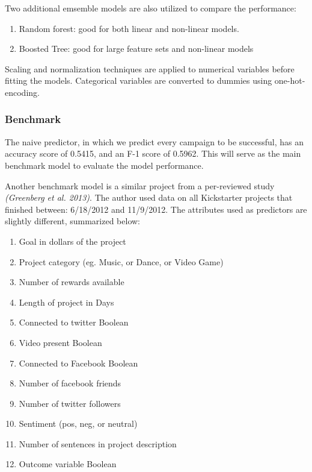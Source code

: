\documentclass[11pt]{article}
\providecommand{\tightlist}{%
      \setlength{\itemsep}{0pt}\setlength{\parskip}{0pt}}
\begin{document}
Two additional emsemble models are also utilized to compare the
performance:

\begin{enumerate}
\def\labelenumi{\arabic{enumi}.}
\tightlist
\item
  Random forest: good for both linear and non-linear models.
\item
  Boosted Tree: good for large feature sets and non-linear models
\end{enumerate}

Scaling and normalization techniques are applied to numerical variables
before fitting the models. Categorical variables are converted to
dummies using one-hot-encoding.

\subsubsection{Benchmark}\label{benchmark}

The naive predictor, in which we predict every campaign to be
successful, has an accuracy score of 0.5415, and an F-1 score of 0.5962.
This will serve as the main benchmark model to evaluate the model
performance.

Another benchmark model is a similar project from a per-reviewed study
\emph{(Greenberg et al. 2013)}. The author used data on all Kickstarter
projects that finished between: 6/18/2012 and 11/9/2012. The attributes
used as predictors are slightly different, summarized below:

\begin{enumerate}
\def\labelenumi{\arabic{enumi}.}
\tightlist
\item
  Goal in dollars of the project
\item
  Project category (eg. Music, or Dance, or Video Game)
\item
  Number of rewards available
\item
  Length of project in Days
\item
  Connected to twitter Boolean
\item
  Video present Boolean
\item
  Connected to Facebook Boolean
\item
  Number of facebook friends
\item
  Number of twitter followers
\item
  Sentiment (pos, neg, or neutral)
\item
  Number of sentences in project description
\item
  Outcome variable Boolean
\end{enumerate}
\end{document}
